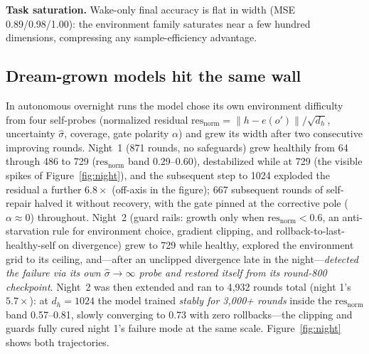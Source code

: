 \documentclass[11pt,a4paper]{article}
\newcommand{\resnorm}{\mathrm{res}_{\mathrm{norm}}}
\begin{document}
\textbf{Task saturation.} Wake-only final accuracy is flat in width (MSE 0.89/0.98/1.00): the environment family saturates near a few hundred dimensions, compressing any sample-efficiency advantage.

\subsection{Dream-grown models hit the same wall}\label{sec:night}

In autonomous overnight runs the model chose its own environment difficulty from four self-probes (normalized residual $\resnorm = \|h - e(o')\|/\sqrt{d_h}$, uncertainty $\hat\sigma$, coverage, gate polarity $\alpha$) and grew its width after two consecutive improving rounds. Night~1 (871 rounds, no safeguards) grew healthily from 64 through 486 to 729 ($\resnorm$ band 0.29--0.60), destabilized while at 729 (the visible spikes of Figure~\ref{fig:night}), and the subsequent step to 1024 exploded the residual a further $6.8\times$ (off-axis in the figure); 667 subsequent rounds of self-repair halved it without recovery, with the gate pinned at the corrective pole ($\alpha \approx 0$) throughout. Night~2 (guard rails: growth only when $\resnorm < 0.6$, an anti-starvation rule for environment choice, gradient clipping, and rollback-to-last-healthy-self on divergence) grew to 729 while healthy, explored the environment grid to its ceiling, and---after an unclipped divergence late in the night---\emph{detected the failure via its own $\hat\sigma \to \infty$ probe and restored itself from its round-800 checkpoint}. Night~2 was then extended and ran to 4{,}932 rounds total (night 1's $5.7\times$): at $d_h{=}1024$ the model trained \emph{stably for 3{,}000+ rounds} inside the $\resnorm$ band 0.57--0.81, slowly converging to 0.73 with zero rollbacks---the clipping and guards fully cured night 1's failure mode at the same scale. Figure~\ref{fig:night} shows both trajectories.
\end{document}

